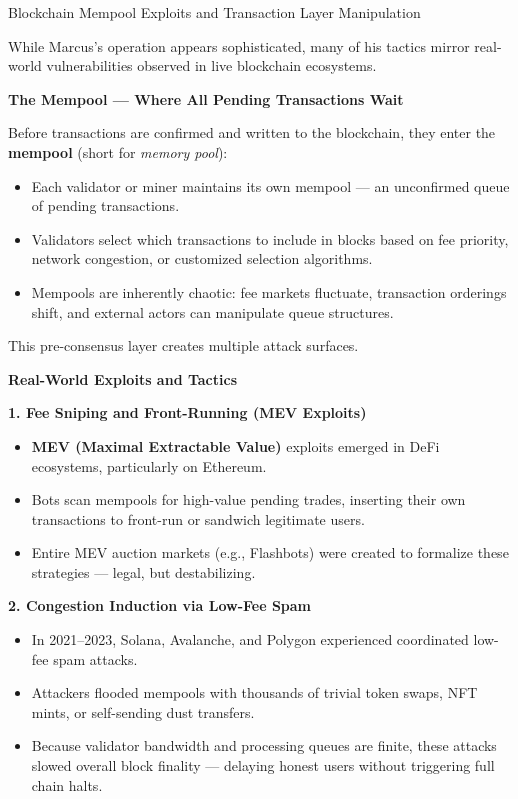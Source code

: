 \begin{HistoricalSidebar}{Blockchain Mempool Exploits and Transaction Layer Manipulation}

    While Marcus's operation appears sophisticated, many of his tactics mirror real-world vulnerabilities observed in live blockchain ecosystems.
    
    \medskip
    
    \textbf{The Mempool --- Where All Pending Transactions Wait}
    
    Before transactions are confirmed and written to the blockchain, they enter the \textbf{mempool} (short for \textit{memory pool}):
    
    \begin{itemize}
        \item Each validator or miner maintains its own mempool --- an unconfirmed queue of pending transactions.
        \item Validators select which transactions to include in blocks based on fee priority, network congestion, or customized selection algorithms.
        \item Mempools are inherently chaotic: fee markets fluctuate, transaction orderings shift, and external actors can manipulate queue structures.
    \end{itemize}
    
    This pre-consensus layer creates multiple attack surfaces.
    
    \medskip
    
    \textbf{Real-World Exploits and Tactics}
    
    \textbf{1. Fee Sniping and Front-Running (MEV Exploits)}
    
    \begin{itemize}
        \item \textbf{MEV (Maximal Extractable Value)} exploits emerged in DeFi ecosystems, particularly on Ethereum.
        \item Bots scan mempools for high-value pending trades, inserting their own transactions to front-run or sandwich legitimate users.
        \item Entire MEV auction markets (e.g., Flashbots) were created to formalize these strategies --- legal, but destabilizing.
    \end{itemize}
    
    \textbf{2. Congestion Induction via Low-Fee Spam}
    
    \begin{itemize}
        \item In 2021--2023, Solana, Avalanche, and Polygon experienced coordinated low-fee spam attacks.
        \item Attackers flooded mempools with thousands of trivial token swaps, NFT mints, or self-sending dust transfers.
        \item Because validator bandwidth and processing queues are finite, these attacks slowed overall block finality --- delaying honest users without triggering full chain halts.
    \end{itemize}
    

\end{HistoricalSidebar}
